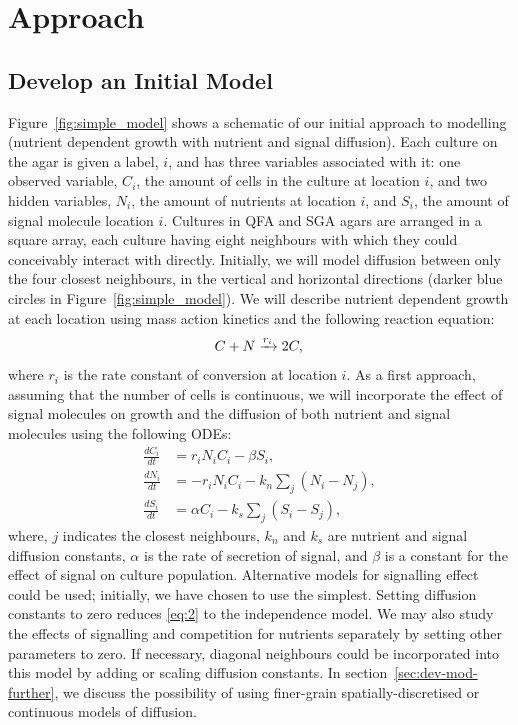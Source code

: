 \graphicspath{{images_low_res/}}
\section{Approach}
\label{sec:approach}

\subsection{Develop an Initial Model}
\label{sec:initial_model}



Figure~\ref{fig:simple_model} shows a schematic of our initial approach to modelling (nutrient dependent growth with nutrient and signal diffusion).
Each culture on the agar is given a label, \(i\), and has three variables associated with it: one observed variable, \(C_{i}\), the amount of cells in the culture at location \(i\), and two hidden variables, \(N_{i}\), the amount of nutrients at location \(i\), and \(S_{i}\), the amount of signal molecule location \(i\).
Cultures in QFA and SGA agars are arranged in a square array, each culture having eight neighbours with which they could conceivably interact with directly. Initially, we will model diffusion between only the four closest neighbours, in the vertical and horizontal directions (darker blue circles in Figure~\ref{fig:simple_model}).
We will describe nutrient dependent growth at each location using mass action kinetics and the following reaction equation:
\begin{equation}
  \label{eq:1}
  C + N \xrightarrow[]{r_{i}} 2C,\\
\end{equation}
where \(r_{i}\) is the rate constant of conversion at location \(i\).
As a first approach, assuming that the number of cells is continuous, we will incorporate the effect of signal molecules on growth and the diffusion of both nutrient and signal molecules using the following ODEs:
\begin{subequations}
  \label{eq:2}
  \begin{align}
    \frac{dC_{i}}{dt}& = r_{i}N_{i}C_{i} - \beta S_{i},\\
    \frac{dN_{i}}{dt}& = - r_{i}N_{i}C_{i} - k_{n}\sum_{j}(N_{i} - N_{j}),\\
    \frac{dS_{i}}{dt}& = \alpha C_{i} - k_{s}\sum_{j}(S_{i} - S_{j}),
  \end{align}
\end{subequations}
where, \(j\) indicates the closest neighbours, \(k_{n}\) and \(k_{s}\) are nutrient and signal diffusion constants, \(\alpha\) is the rate of secretion of signal, and \(\beta\) is a constant for the effect of signal on culture population. Alternative models for signalling effect could be used; initially, we have chosen to use the simplest. Setting diffusion constants to zero reduces \ref{eq:2} to the independence model. We may also study the effects of signalling and competition for nutrients separately by setting other parameters to zero. If necessary, diagonal neighbours could be incorporated into this model by adding or scaling diffusion constants. In section~\ref{sec:dev-mod-further}, we discuss the possibility of using finer-grain spatially-discretised or continuous models of diffusion.
